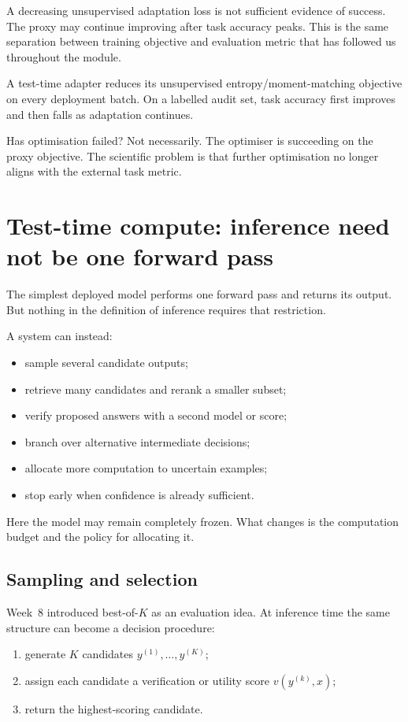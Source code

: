 A decreasing unsupervised adaptation loss is not sufficient evidence of success. The proxy may continue improving after task accuracy peaks. This is the same separation between training objective and evaluation metric that has followed us throughout the module.

\begin{checkpointbox}
A test-time adapter reduces its unsupervised entropy/moment-matching objective on every deployment batch. On a labelled audit set, task accuracy first improves and then falls as adaptation continues.

Has optimisation failed? Not necessarily. The optimiser is succeeding on the proxy objective. The scientific problem is that further optimisation no longer aligns with the external task metric.
\end{checkpointbox}

\section{Test-time compute: inference need not be one forward pass}

The simplest deployed model performs one forward pass and returns its output. But nothing in the definition of inference requires that restriction.

A system can instead:
\begin{itemize}[leftmargin=*]
  \item sample several candidate outputs;
  \item retrieve many candidates and rerank a smaller subset;
  \item verify proposed answers with a second model or score;
  \item branch over alternative intermediate decisions;
  \item allocate more computation to uncertain examples;
  \item stop early when confidence is already sufficient.
\end{itemize}

Here the model may remain completely frozen. What changes is the computation budget and the policy for allocating it.

\subsection{Sampling and selection}

Week~8 introduced best-of-\(K\) as an evaluation idea. At inference time the same structure can become a decision procedure:
\begin{enumerate}[leftmargin=*]
  \item generate \(K\) candidates \(y^{(1)},\ldots,y^{(K)}\);
  \item assign each candidate a verification or utility score \(v(y^{(k)},x)\);
  \item return the highest-scoring candidate.
\end{enumerate}


